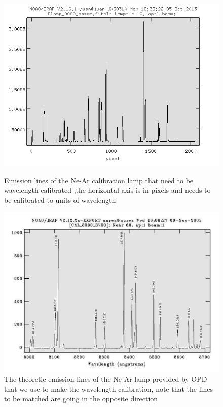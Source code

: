 \begin{figure}[H]
  \centering
  \begin{minipage}[b]{0.48\textwidth}
    \includegraphics[width=\textwidth]{images/lamp_day1_2.png}
    \caption[Emission lines for the Ne-Ar calibration lamp]{Emission lines of the Ne-Ar calibration lamp that need to be wavelength calibrated ,the horizontal axis is in pixels and needs to be calibrated to units of wavelength}
  \end{minipage}
  \hfill
  \begin{minipage}[b]{0.48\textwidth}
    \includegraphics[width=\textwidth]{images/lamp1.png}
    \caption[Theoric emisison lines of a Ne-Ar lamp]{The theoretic emission lines of the Ne-Ar lamp provided by OPD that we use to make the wavelength calibration, note that the lines to be matched are going in the opposite direction}
  \end{minipage}
\end{figure}

